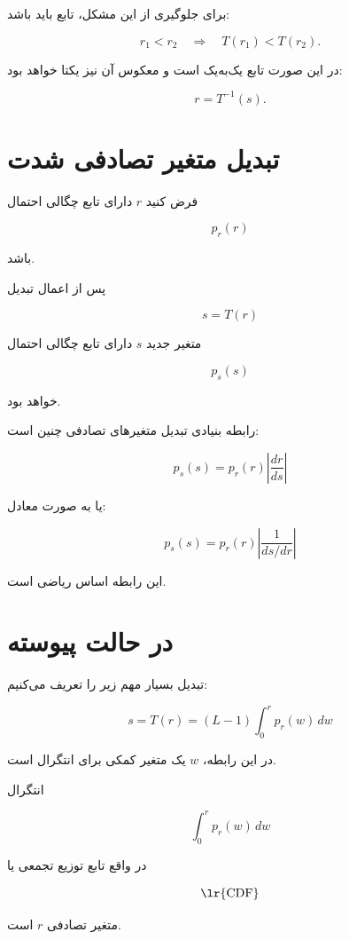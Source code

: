 \documentclass[12pt,a4paper]{article}
\begin{document}
	برای جلوگیری از این مشکل، تابع باید \textbf{}
	باشد:
	
	\[
	r_1<r_2
	\quad\Longrightarrow\quad
	T(r_1)<T(r_2).
	\]
	
	در این صورت تابع یک‌به‌یک است و معکوس آن نیز یکتا خواهد بود:
	
	\[
	r=T^{-1}(s).
	\]
	
	
	\section{تبدیل متغیر تصادفی شدت}
	
	فرض کنید $r$ دارای تابع چگالی احتمال
	
	\[
	p_r(r)
	\]
	
	باشد.
	
	پس از اعمال تبدیل
	
	\[
	s=T(r)
	\]
	
	متغیر جدید $s$ دارای تابع چگالی احتمال
	
	\[
	p_s(s)
	\]
	
	خواهد بود.
	
	رابطه بنیادی تبدیل متغیرهای تصادفی چنین است:
	
	\[
	\boxed{
		p_s(s)
		=
		p_r(r)
		\left|
		\frac{dr}{ds}
		\right|
	}
	\tag{1}
	\]
	
	یا به صورت معادل:
	
	\[
	\boxed{
		p_s(s)
		=
		p_r(r)
		\left|
		\frac{1}{ds/dr}
		\right|
	}
	\tag{2}
	\]
	
	این رابطه اساس ریاضی  است.
	
	
	\section{ در حالت پیوسته}
	
	تبدیل بسیار مهم زیر را تعریف می‌کنیم:
	
	\[
	\boxed{
		s=T(r)
		=
		(L-1)
		\int_0^r p_r(w)\,dw
	}
	\tag{3}
	\]
	
	در این رابطه، $w$ یک متغیر کمکی برای انتگرال است.
	
	انتگرال
	
	\[
	\int_0^r p_r(w)\,dw
	\]
	
	در واقع تابع توزیع تجمعی یا
	
	\[
	\text{\lr{CDF}}
	\]
	
	متغیر تصادفی $r$ است.
	
\end{document}
